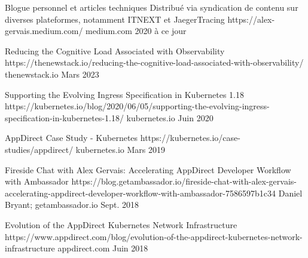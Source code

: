 

\begin{cvhonors}


  \cvhonor
    {Blogue personnel et articles techniques} %
    {Distribué via syndication de contenu sur diverses plateformes, notamment ITNEXT et JaegerTracing } %
    {https://alex-gervais.medium.com/} %
    {medium.com} %
    {2020 à ce jour} %

  \cvhonor
    {Reducing the Cognitive Load Associated with Observability} %
    {} %
    {https://thenewstack.io/reducing-the-cognitive-load-associated-with-observability/} %
    {thenewstack.io} %
    {Mars 2023} %

  \cvhonor
    {Supporting the Evolving Ingress Specification in Kubernetes 1.18} %
    {} %
    {https://kubernetes.io/blog/2020/06/05/supporting-the-evolving-ingress-specification-in-kubernetes-1.18/} %
    {kubernetes.io} %
    {Juin 2020} %

  \cvhonor
    {AppDirect Case Study - Kubernetes} %
    {} %
    {https://kubernetes.io/case-studies/appdirect/} %
    {kubernetes.io} %
    {Mars 2019} %

  \cvhonor
    {Fireside Chat with Alex Gervais: Accelerating AppDirect Developer Workflow with Ambassador} %
    {} %
    {https://blog.getambassador.io/fireside-chat-with-alex-gervais-accelerating-appdirect-developer-workflow-with-ambassador-7586597b1c34} %
    {Daniel Bryant; getambassador.io} %
    {Sept. 2018} %

  \cvhonor
    {Evolution of the AppDirect Kubernetes Network Infrastructure} %
    {} %
    {https://www.appdirect.com/blog/evolution-of-the-appdirect-kubernetes-network-infrastructure} %
    {appdirect.com} %
    {Juin 2018} %

\end{cvhonors}


